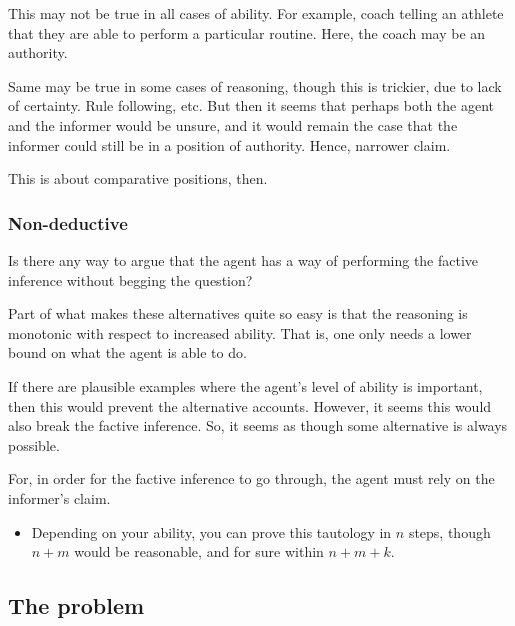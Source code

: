 \documentclass[10pt]{article}
\begin{document}
\begin{note}
  This may not be true in all cases of ability.
  For example, coach telling an athlete that they are able to perform a particular routine.
  Here, the coach may be an authority.

  Same may be true in some cases of reasoning, though this is trickier, due to lack of certainty.
  Rule following, etc.
  But then it seems that perhaps both the agent and the informer would be unsure, and it would remain the case that the informer could still be in a position of authority.
  Hence, narrower claim.

  This is about comparative positions, then.
\end{note}

\subsubsection{Non-deductive}
\label{sec:non-deductive}

\begin{note}[Idea?]
  Is there any way to argue that the agent has a way of performing the factive inference without begging the question?
\end{note}

\begin{note}[Aside]
  Part of what makes these alternatives quite so easy is that the reasoning is monotonic with respect to increased ability.
  That is, one only needs a lower bound on what the agent is able to do.

  If there are plausible examples where the agent's level of ability is important, then this would prevent the alternative accounts.
  However, it seems this would also break the factive inference.
  So, it seems as though some alternative is always possible.

  For, in order for the factive inference to go through, the agent must rely on the informer's claim.
  \begin{itemize}
  \item Depending on your ability, you can prove this tautology in \(n\) steps, though \(n + m\) would be reasonable, and for sure within \(n + m + k\).
  \end{itemize}
\end{note}

\subsection{The problem}
\label{sec:problem-1}
\end{document}
